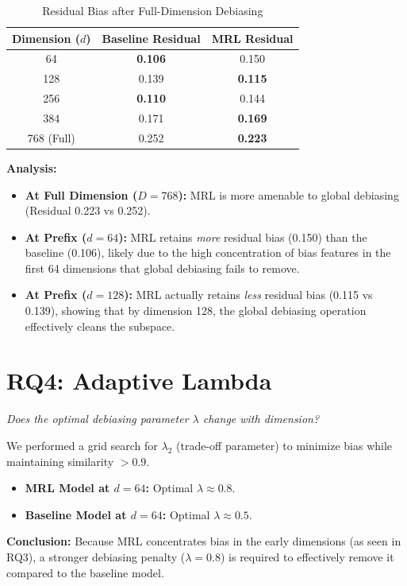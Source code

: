 \documentclass{article}
\begin{document}
\begin{table}[H]
    \centering
    \caption{Residual Bias after Full-Dimension Debiasing}
    \begin{tabular}{c c c}
    \toprule
    Dimension ($d$) & Baseline Residual & MRL Residual \\
    \midrule
    64 & \textbf{0.106} & 0.150 \\
    128 & 0.139 & \textbf{0.115} \\
    256 & \textbf{0.110} & 0.144 \\
    384 & 0.171 & \textbf{0.169} \\
    \midrule
    768 (Full) & 0.252 & \textbf{0.223} \\
    \bottomrule
    \end{tabular}
\end{table}

\textbf{Analysis:}
\begin{itemize}
    \item \textbf{At Full Dimension ($D=768$):} MRL is more amenable to global debiasing (Residual 0.223 vs 0.252).
    \item \textbf{At Prefix ($d=64$):} MRL retains \textit{more} residual bias (0.150) than the baseline (0.106), likely due to the high concentration of bias features in the first 64 dimensions that global debiasing fails to remove.
    \item \textbf{At Prefix ($d=128$):} MRL actually retains \textit{less} residual bias (0.115 vs 0.139), showing that by dimension 128, the global debiasing operation effectively cleans the subspace.
\end{itemize}

\section{RQ4: Adaptive Lambda}
\textit{Does the optimal debiasing parameter $\lambda$ change with dimension?}

We performed a grid search for $\lambda_2$ (trade-off parameter) to minimize bias while maintaining similarity $>0.9$.

\begin{itemize}
    \item \textbf{MRL Model at $d=64$:} Optimal $\lambda \approx 0.8$.
    \item \textbf{Baseline Model at $d=64$:} Optimal $\lambda \approx 0.5$.
\end{itemize}

\textbf{Conclusion:} Because MRL concentrates bias in the early dimensions (as seen in RQ3), a stronger debiasing penalty ($\lambda=0.8$) is required to effectively remove it compared to the baseline model.
\end{document}
